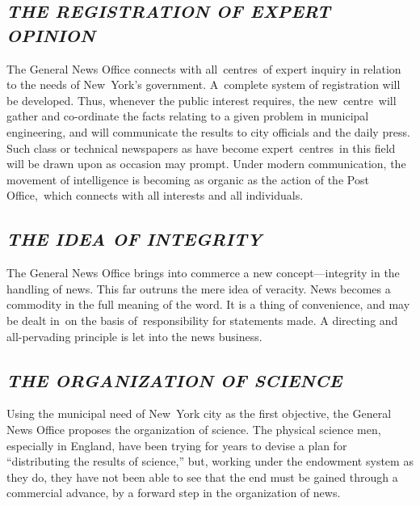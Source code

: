 \documentclass[twoside,symmetric,nobib,justified]{tufte-book}
\begin{document}
\hypertarget{the-registration-of-expert-opinion}{%
\subsection{\emph{THE REGISTRATION OF EXPERT
OPINION}}\label{the-registration-of-expert-opinion}}

The General News Office connects with all~centres~of expert inquiry in
relation to the needs of New~York's government. A~complete system of
registration will be developed. Thus, whenever the public interest
requires, the new~centre~will gather and co-ordinate the facts relating
to a given problem in municipal engineering, and will communicate the
results to city officials and the daily press. Such class or technical
newspapers as have become expert~centres~in this field will be drawn
upon as occasion may prompt. Under modern communication, the movement of
intelligence is becoming as organic as the action of the Post
Office,~which connects with all interests and all individuals.~

\enlargethispage{\baselineskip}

\hypertarget{the-idea-of-integrity}{%
\subsection{\emph{THE IDEA OF INTEGRITY}}\label{the-idea-of-integrity}}

The General News Office brings into commerce a new concept---integrity
in the handling of news. This far outruns the mere idea of veracity.
News becomes a commodity in the full meaning of the word. It is a thing
of convenience, and may be dealt in~on the basis of~responsibility for
statements made. A directing and all-pervading principle is let into the
news business.~

\hypertarget{the-organization-of-science}{%
\subsection{\emph{THE ORGANIZATION OF
SCIENCE}}\label{the-organization-of-science}}

Using the municipal need of New~York city as the first objective, the
General News Office proposes the organization of science. The physical
science men, especially in England, have been trying for years to devise
a plan for ``distributing the results of science,'' but, working under
the endowment system as they do, they have not been able to see that the
end must be gained through a commercial advance, by a forward step in
the organization of news.~
\end{document}

